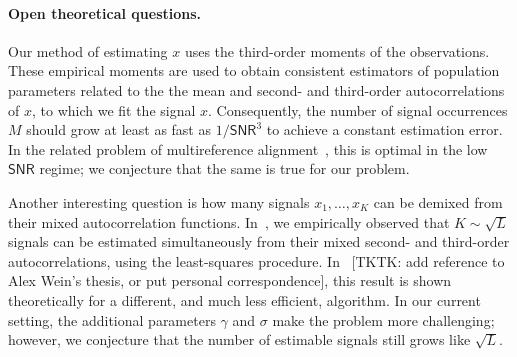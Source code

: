 \documentclass[english,11pt]{article}
\newcommand{\1}{\mathbf{1}}
\numberwithin{equation}{section}
\theoremstyle{plain}
\theoremstyle{definition}
\theoremstyle{remark}
\theoremstyle{plain}
\theoremstyle{remark}
\theoremstyle{plain}
\theoremstyle{plain}
\newcommand{\SNR}{\ensuremath{\textsf{SNR}}}
\begin{document}
\paragraph{Open theoretical questions.}

Our method of estimating $x$ uses the third-order moments of the observations. These empirical moments are used to obtain consistent estimators of population parameters related to the the mean and second- and third-order autocorrelations of $x$, to which we fit the signal $x$. Consequently, the number of signal occurrences $M$ should grow at least as fast as $1/\SNR^3$ to achieve a constant estimation error. In the related problem of multireference alignment~\cite{perry2017sample,abbe2017multireference}, this is optimal in the low $\SNR$ regime; we conjecture that the same is true for our problem.



Another interesting question is how many signals $x_1,\dots,x_K$ can be demixed from their mixed autocorrelation functions. In~\cite{boumal2017heterogeneous}, we empirically observed that $K \sim \sqrt{L}$ signals can be estimated simultaneously from their mixed second- and third-order autocorrelations, using the least-squares procedure. In~\cite{weinthesis} [TKTK: add reference to Alex Wein's thesis, or put personal correspondence], this result is shown theoretically for a different, and much less efficient, algorithm. In our current setting, the additional parameters $\gamma$ and $\sigma$ make the problem more challenging; however, we conjecture that the number of estimable signals still grows like $\sqrt{L}$.





\end{document}
